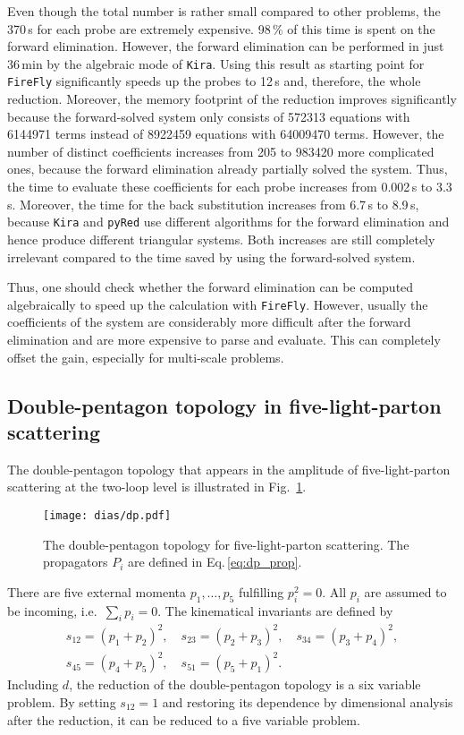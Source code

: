 \documentclass[11pt,a4paper,DIV=11,numbers=noenddot,parskip=half]{scrartcl}
\newcommand{\code}[1]{\texttt{#1}}
\newcommand*{\kira}{\code{Kira}}
\newcommand*{\pyred}{\code{pyRed}}
\newcommand*{\firefly}{\code{FireFly}}
\begin{document}
Even though the total number is rather small compared to other problems, the 370\,s for each probe are extremely expensive.
98\,\% of this time is spent on the forward elimination.
However, the forward elimination can be performed in just 36\,min by the algebraic mode of \kira{}.
Using this result as starting point for \firefly{} significantly speeds up the probes to 12\,s and, therefore, the whole reduction.
Moreover, the memory footprint of the reduction improves significantly because the forward-solved system only consists of 572313 equations with 6144971 terms instead of 8922459 equations with 64009470 terms.
However, the number of distinct coefficients increases from 205 to 983420 more complicated ones, because the forward elimination already partially solved the system.
Thus, the time to evaluate these coefficients for each probe increases from 0.002\,s to 3.3\,s.
Moreover, the time for the back substitution increases from 6.7\,s to 8.9\,s, because \kira{} and \pyred{} use different algorithms for the forward elimination and hence produce different triangular systems.
Both increases are still completely irrelevant compared to the time saved by using the forward-solved system.

Thus, one should check whether the forward elimination can be computed algebraically to speed up the calculation with \firefly{}.
However, usually the coefficients of the system are considerably more difficult after the forward elimination and are more expensive to parse and evaluate.
This can completely offset the gain, especially for multi-scale problems.


\subsection{Double-pentagon topology in five-light-parton scattering}
\label{sect:double_pentagon}

The double-pentagon topology that appears in the amplitude of five-light-parton scattering at the two-loop level is illustrated in Fig.~\ref{fig:dp}.
\begin{figure}[ht]
\centering
\texttt{[image: dias/dp.pdf]}
\caption{The double-pentagon topology for five-light-parton scattering. The propagators $P_i$ are defined in Eq.\,\eqref{eq:dp_prop}.}
\label{fig:dp}
\end{figure}
There are five external momenta $p_1,\dots,p_5$ fulfilling $p_i^2=0$. All $p_i$ are assumed to be incoming, i.e.\ $\sum_i p_i=0$.
The kinematical invariants are defined by
\begin{equation}
  \begin{gathered}
    s_{12} = (p_1+p_2)^2,\quad s_{23} = (p_2+p_3)^2,\quad s_{34} = (p_3+p_4)^2,\\
    s_{45} = (p_4+p_5)^2,\quad s_{51} = (p_5+p_1)^2.
  \end{gathered}
\end{equation}
Including $d$, the reduction of the double-pentagon topology is a six variable problem. By setting $s_{12} = 1$ and restoring its dependence by dimensional analysis after the reduction, it can be reduced to a five variable problem.
\end{document}
